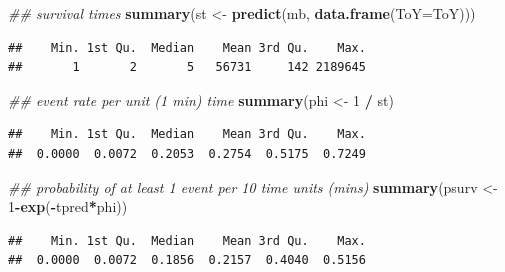 \documentclass[12pt,]{book}
\newenvironment{Shaded}{\begin{snugshade}}{\end{snugshade}}
\newcommand{\CommentTok}[1]{\textcolor[rgb]{0.56,0.35,0.01}{\textit{#1}}}
\newcommand{\DataTypeTok}[1]{\textcolor[rgb]{0.13,0.29,0.53}{#1}}
\newcommand{\DecValTok}[1]{\textcolor[rgb]{0.00,0.00,0.81}{#1}}
\newcommand{\KeywordTok}[1]{\textcolor[rgb]{0.13,0.29,0.53}{\textbf{#1}}}
\newcommand{\NormalTok}[1]{#1}
\newcommand{\OperatorTok}[1]{\textcolor[rgb]{0.81,0.36,0.00}{\textbf{#1}}}
\newcommand{\StringTok}[1]{\textcolor[rgb]{0.31,0.60,0.02}{#1}}
\begin{document}
\begin{Shaded}
\begin{Highlighting}[]
\CommentTok{## survival times}
\KeywordTok{summary}\NormalTok{(st <-}\StringTok{ }\KeywordTok{predict}\NormalTok{(mb, }\KeywordTok{data.frame}\NormalTok{(}\DataTypeTok{ToY=}\NormalTok{ToY)))}
\end{Highlighting}
\end{Shaded}

\begin{verbatim}
##    Min. 1st Qu.  Median    Mean 3rd Qu.    Max. 
##       1       2       5   56731     142 2189645
\end{verbatim}

\begin{Shaded}
\begin{Highlighting}[]
\CommentTok{## event rate per unit (1 min) time}
\KeywordTok{summary}\NormalTok{(phi <-}\StringTok{ }\DecValTok{1} \OperatorTok{/}\StringTok{ }\NormalTok{st)}
\end{Highlighting}
\end{Shaded}

\begin{verbatim}
##    Min. 1st Qu.  Median    Mean 3rd Qu.    Max. 
##  0.0000  0.0072  0.2053  0.2754  0.5175  0.7249
\end{verbatim}

\begin{Shaded}
\begin{Highlighting}[]
\CommentTok{## probability of at least 1 event per 10 time units (mins)}
\KeywordTok{summary}\NormalTok{(psurv <-}\StringTok{ }\DecValTok{1}\OperatorTok{-}\KeywordTok{exp}\NormalTok{(}\OperatorTok{-}\NormalTok{tpred}\OperatorTok{*}\NormalTok{phi))}
\end{Highlighting}
\end{Shaded}

\begin{verbatim}
##    Min. 1st Qu.  Median    Mean 3rd Qu.    Max. 
##  0.0000  0.0072  0.1856  0.2157  0.4040  0.5156
\end{verbatim}
\end{document}
